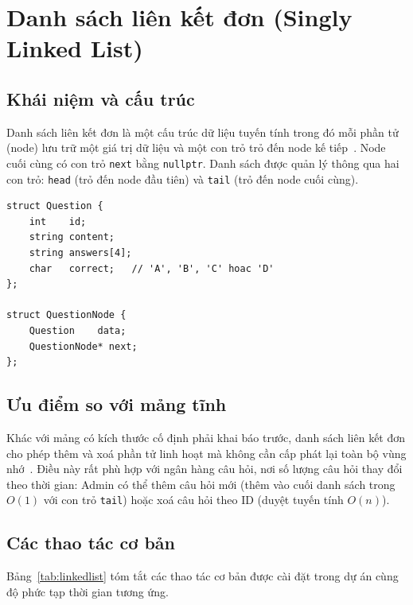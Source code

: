 \documentclass[11pt]{report}
\begin{document}
\section{Danh sách liên kết đơn (Singly Linked List)}

\subsection{Khái niệm và cấu trúc}

Danh sách liên kết đơn là một cấu trúc dữ liệu tuyến tính trong đó mỗi phần tử (node) lưu trữ một giá trị dữ liệu và một con trỏ trỏ đến node kế tiếp~\cite{cormen2009}. Node cuối cùng có con trỏ \texttt{next} bằng \texttt{nullptr}. Danh sách được quản lý thông qua hai con trỏ: \texttt{head} (trỏ đến node đầu tiên) và \texttt{tail} (trỏ đến node cuối cùng).

\begin{lstlisting}[caption={Định nghĩa node danh sách liên kết đơn cho câu hỏi}, label={lst:node}]
struct Question {
    int    id;
    string content;
    string answers[4];
    char   correct;   // 'A', 'B', 'C' hoac 'D'
};

struct QuestionNode {
    Question    data;
    QuestionNode* next;
};
\end{lstlisting}

\subsection{Ưu điểm so với mảng tĩnh}

Khác với mảng có kích thước cố định phải khai báo trước, danh sách liên kết đơn cho phép thêm và xoá phần tử linh hoạt mà không cần cấp phát lại toàn bộ vùng nhớ~\cite{cormen2009}. Điều này rất phù hợp với ngân hàng câu hỏi, nơi số lượng câu hỏi thay đổi theo thời gian: Admin có thể thêm câu hỏi mới (thêm vào cuối danh sách trong $O(1)$ với con trỏ \texttt{tail}) hoặc xoá câu hỏi theo ID (duyệt tuyến tính $O(n)$).

\subsection{Các thao tác cơ bản}

Bảng~\ref{tab:linkedlist} tóm tắt các thao tác cơ bản được cài đặt trong dự án cùng độ phức tạp thời gian tương ứng.
\end{document}
